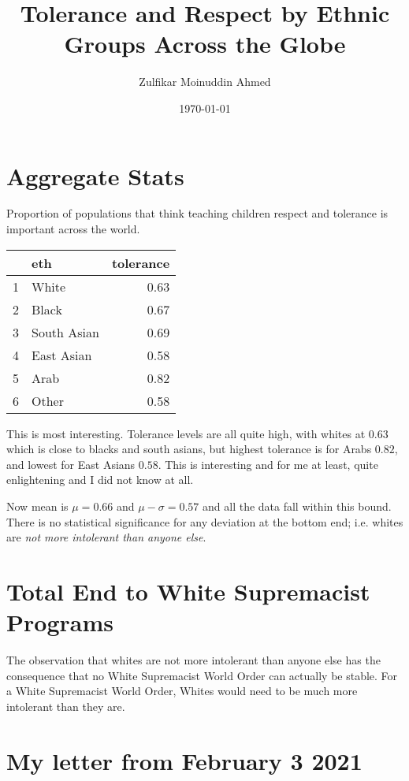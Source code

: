 \documentclass{amsart}
\title{Tolerance and Respect by Ethnic Groups Across the Globe}
\author{Zulfikar Moinuddin Ahmed}
\date{\today}
\begin{document}
\maketitle

\section{Aggregate Stats}

Proportion of populations that think teaching children respect and tolerance is important across the world.
\begin{table}[ht]
\centering
\begin{tabular}{rlr}
  \hline
 & eth & tolerance \\ 
  \hline
1 & White & 0.63 \\ 
  2 & Black & 0.67 \\ 
  3 & South Asian & 0.69 \\ 
  4 & East Asian & 0.58 \\ 
  5 & Arab & 0.82 \\ 
  6 & Other & 0.58 \\ 
   \hline
\end{tabular}
\end{table}
This is most interesting.  Tolerance levels are all quite high, with whites at $0.63$ which is close to blacks and south asians, but highest tolerance is for Arabs $0.82$, and lowest for East Asians $0.58$.  This is interesting and for me at least, quite enlightening and I did not know at all.

Now mean is $\mu=0.66$ and $\mu-\sigma=0.57$ and all the data fall within this bound.  There is no statistical significance for any deviation at the bottom end; i.e. whites are {\em not more intolerant than anyone else}. 

\section{Total End to White Supremacist Programs}

The observation that whites are not more intolerant than anyone else has the consequence that no White Supremacist World Order can actually be stable.  For a White Supremacist World Order, Whites would need to be much more intolerant than they are.

\section{My letter from February 3 2021}
\end{document}
